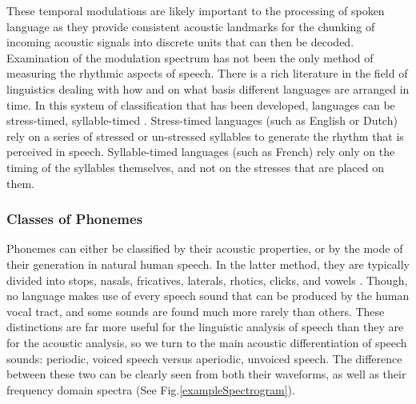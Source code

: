 \documentclass[titlepage]{article}
\begin{document}
    These temporal modulations are likely important to the processing of spoken language 
    as they provide consistent acoustic landmarks for the chunking of incoming acoustic
    signals into discrete units that can then be decoded. Examination of the 
    modulation spectrum has not been the only method of measuring the rhythmic 
    aspects of speech. There is a rich literature in the field of linguistics 
    dealing with how and on what basis different languages are arranged in time.
    In this system of classification that has been developed, languages can be 
    stress-timed, syllable-timed \cite{Ramus2000}. Stress-timed 
    languages (such as English or Dutch) rely on a series of stressed or 
    un-stressed syllables to generate the rhythm that is perceived in speech. 
    Syllable-timed languages (such as French) rely only on the timing of the 
    syllables themselves, and not on the stresses that are placed on them. 
    
    \subsubsection{Classes of Phonemes}

    Phonemes can either be classified by their acoustic properties,
    or by the mode of their generation in natural human speech. In the latter
    method, they are typically divided into stops, nasals, fricatives, laterals, rhotics,
    clicks, and vowels \cite{Ladefoged1996}. Though, no language makes use of every speech sound
    that can be produced by the human vocal tract, and some sounds are found much
    more rarely than others. These distinctions are far more useful for the linguistic analysis
    of speech than they are for the acoustic analysis, so we turn to the main acoustic
    differentiation of speech sounds: periodic, voiced speech versus aperiodic, unvoiced speech.
    The difference between these two can be clearly seen from both their waveforms, as well as
    their frequency domain spectra (See Fig.\ref{exampleSpectrogram}).
\end{document}
